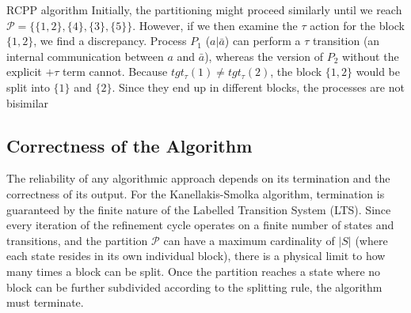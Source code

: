 \begin{Example}{RCPP algorithm}{}
    Initially, the partitioning might proceed similarly until we reach $\mathcal{P} = \{\{1, 2\}, \{4\}, \{3\}, \{5\}\}$. However, if we then examine the $\tau$ action for the block $\{1, 2\}$, we find a discrepancy. Process $P_1$ ($a|\bar{a}$) can perform a $\tau$ transition (an internal communication between $a$ and $\bar{a}$), whereas the version of $P_2$ without the explicit $+\tau$ term cannot. Because $tgt_{\tau}(1) \neq tgt_{\tau}(2)$, the block $\{1, 2\}$ would be split into $\{1\}$ and $\{2\}$. Since they end up in different blocks, the processes are not bisimilar
\end{Example}

\subsection{Correctness of the Algorithm}
The reliability of any algorithmic approach depends on its termination and the correctness of its output. For the Kanellakis-Smolka algorithm, termination is guaranteed by the finite nature of the Labelled Transition System (LTS). Since every iteration of the refinement cycle operates on a finite number of states and transitions, and the partition $\mathcal{P}$ can have a maximum cardinality of $|S|$ (where each state resides in its own individual block), there is a physical limit to how many times a block can be split. Once the partition reaches a state where no block can be further subdivided according to the splitting rule, the algorithm must terminate.

